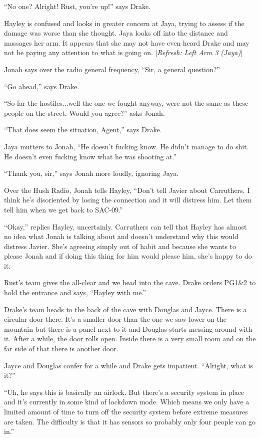 ``No one?  Alright!  Rust, you're up!'' says Drake.

Hayley is confused and looks in greater concern at Jaya, trying to assess if the damage was worse than she thought.  Jaya looks off into the distance and massages her arm.  It appears that she may not have even heard Drake and may not be paying any attention to what is going on. {[}\textit{Refresh: Left Arm 3 (Jaya)}{]}

Jonah says over the radio general frequency, ``Sir, a general question?''

``Go ahead,'' says Drake.

``So far the hostiles...well the one we fought anyway, were not the same as these people on the street.  Would you agree?'' asks Jonah.

``That does seem the situation, Agent,'' says Drake.

Jaya mutters to Jonah, ``He doesn't fucking know.  He didn't manage to do shit.  He doesn't even fucking know what he was shooting at.''

``Thank you, sir,'' says Jonah more loudly, ignoring Jaya.



Over the Hush Radio, Jonah tells Hayley, ``Don't tell Javier about Carruthers.  I think he's disoriented by losing the connection and it will distress him.  Let them tell him when we get back to SAC-09.''

``Okay,'' replies Hayley, uncertainly.  Carruthers can tell that Hayley has almost no idea what Jonah is talking about and doesn't understand why this would distress Javier.  She's agreeing simply out of habit and because she wants to please Jonah and if doing this thing for him would please him, she's happy to do it.



Rust's team gives the all-clear and we head into the cave.   Drake orders PG1\&2 to hold the entrance and says, ``Hayley with me.''

Drake's team heads to the back of the cave with Douglas and Jayce.  There is a circular door there.  It's a smaller door than the one we saw lower on the mountain but there is a panel next to it and Douglas starts messing around with it.  After a while, the door rolls open.  Inside there is a very small room and on the far side of that there is another door.

Jayce and Douglas confer for a while and Drake gets impatient.  ``Alright, what is it?''

``Uh, he says this is basically an airlock.  But there's a security system in place and it's currently in some kind of lockdown mode.  Which means we only have a limited amount of time to turn off the security system before extreme measures are taken.  The difficulty is that it has sensors so probably only four people can go in.''

